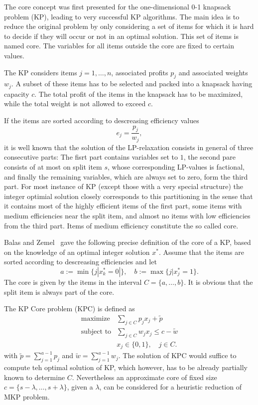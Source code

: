 The core concept was first presented for the one-dimensional 0-1 knapsack problem (KP),
leading to very successful KP algorithms.
The main idea is to reduce the original problem by only considering a set of
items for which it is hard to decide if they will occur or not in an optimal solution.
This set of items is named core.
The variables for all items outside the core are fixed to certain values.

The KP considers items $j = 1, \ldots, n$, associated profits $p_j$ and
associated weights $w_j$.
A subset of these items has to be selected and packed into a knapsack having capacity $c$.
The total profit of the items in the knapsack has to be maximized, while the
total weight is not allowed to exceed $c$.

If the items are sorted according to descreasing efficiency values
\begin{displaymath}
  e_j = \frac{p_j}{w_j},
\end{displaymath}
it is well known that the solution of the LP-relaxation consists in general of
three consecutive parts: The fisrt part contains variables set to $1$, the second
pare consists of at most on split item $s$, whose corresponding LP-values is
factional, and finally the remaining variables, which are always set to zero,
form the third part.
For most instance of KP (except those with a very special structure) the integer
optimial solution closely corresponds to this partitioning in the sense that it
contains most of the highly efficient items of the first part, some items with
medium efficiencies near the split item, and almost no items with low efficiencies
from the third part.
Items of medium efficiency constitute the so called core.

Balas and Zemel~\cite{balas1980algorithm} gave the following precise definition
of the core of a KP, based on the knowledge of an optimal integer solution $x^*$.
Assume that the items are sorted according to descreasing efficiencies and let
\begin{displaymath}
  a := \min\{ j | x_k^* = 0 |\}, \quad b := \max\{ j | x_j^* = 1 \}.
\end{displaymath}
The core is given by the items in the interval $C = \{a, \ldots, b\}$.
It is obvious that the split item is always part of the core.

The KP Core problem (KPC) is defined as
\begin{align*}
  \text{maximize} & \sum_{j \in C} p_j x_j  + \tilde{p}\\
  \text{subject to} & \sum_{j \in C} w_{j} x_j \leqslant c - \tilde{w}\\
  & x_j \in \{0, 1\}, \quad j \in C.
\end{align*}
with $\tilde{p} = \sum^{a-1}_{j=1} p_j$  and $\tilde{w} = \sum^{a-1}_{j=1} w_j$.
The solution of KPC would suffice to compute teh optimal solution of KP, which
however, has to be already partially known to determine $C$.
Nevertheless an approximate core of fixed size $c = \{s-\lambda, \ldots, s+\lambda\}$,
given a $\lambda$, can be considered for a heuristic reduction of MKP problem.

